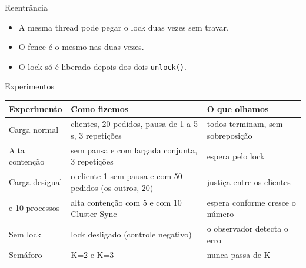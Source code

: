 \documentclass[aspectratio=169,11pt]{beamer}
\begin{document}
\begin{frame}{Reentrância}
\centering
{}
\begin{itemize}\setlength\itemsep{0.15cm}
\item A mesma thread pode pegar o lock duas vezes sem travar.
\item O fence é o mesmo nas duas vezes.
\item O lock só é liberado depois dos dois \texttt{unlock()}.
\end{itemize}
\end{frame}

\begin{frame}{Experimentos}
\small
\renewcommand{\arraystretch}{1.3}
\begin{tabular}{@{}>{\raggedright\arraybackslash}p{4.2cm}>{\raggedright\arraybackslash}p{5.8cm}>{\raggedright\arraybackslash}p{4.2cm}@{}}
\toprule
\textbf{Experimento} & \textbf{Como fizemos} & \textbf{O que olhamos}\\
\midrule
Carga normal & 5 clientes, 20 pedidos, pausa de 1 a 5 s, 3 repetições & todos terminam, sem sobreposição\\
Alta contenção & sem pausa e com largada conjunta, 3 repetições & espera pelo lock\\
Carga desigual & o cliente 1 sem pausa e com 50 pedidos (os outros, 20) & justiça entre os clientes\\
5 e 10 processos & alta contenção com 5 e com 10 Cluster Sync & espera conforme cresce o número\\
Sem lock & lock desligado (controle negativo) & o observador detecta o erro\\
Semáforo & K=2 e K=3 & nunca passa de K\\
\bottomrule
\end{tabular}
\end{frame}
\end{document}
